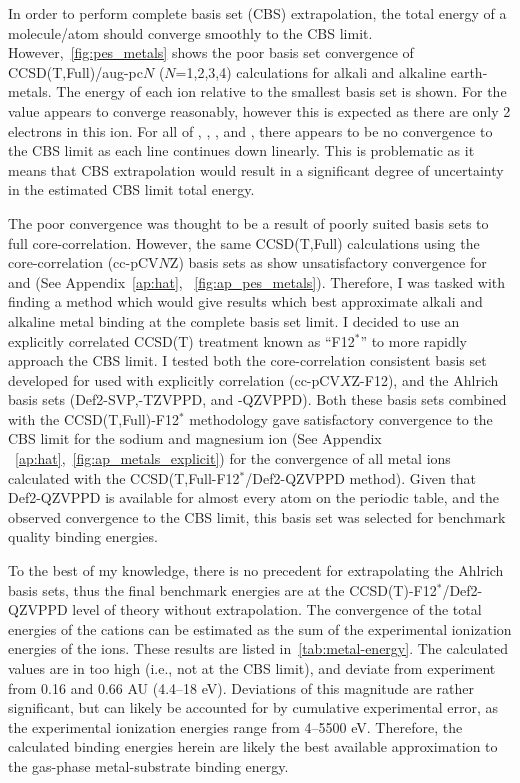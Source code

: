 In order to perform complete basis set (CBS) extrapolation, the total energy of a molecule/atom should converge smoothly to the CBS limit.\cite{Truhlar1998} However,~\ref{fig:pes_metals} shows the poor basis set convergence of CCSD(T,Full)/aug-pc$N$ ($N$=1,2,3,4) calculations for alkali and alkaline earth-metals. The energy of each ion relative to the smallest basis set is shown. For  the value appears to converge reasonably, however this is expected as there are only 2 electrons in this ion. For all of , , , and , there appears to be no convergence to the CBS limit as each line continues down linearly. This is problematic as it means that CBS extrapolation would result in a significant degree of uncertainty in the estimated CBS limit total energy.

The poor convergence was thought to be a result of poorly suited basis sets to full core-correlation. However, the same CCSD(T,Full) calculations using the core-correlation (cc-pCV$N$Z) basis sets as show unsatisfactory convergence for  and  (See Appendix~\ref{ap:hat}, ~\ref{fig:ap_pes_metals}). Therefore, I was tasked with finding a method which would give results which best approximate alkali and alkaline metal binding at the complete basis set limit. I decided to use an explicitly correlated CCSD(T) treatment known as ``F12$^*$'' to more rapidly approach the CBS limit.\cite{Tenno2012} I tested both the core-correlation consistent basis set developed for used with explicitly correlation (cc-pCV$X$Z-F12),\cite{Peterson2008} and the Ahlrich basis sets (Def2-SVP,-TZVPPD, and -QZVPPD).\cite{Rappoport2010} Both these basis sets combined with the CCSD(T,Full)-F12$^*$ methodology gave satisfactory convergence to the CBS limit for the sodium and magnesium ion (See Appendix ~\ref{ap:hat},~\ref{fig:ap_metals_explicit}) for the convergence of all metal ions calculated with the CCSD(T,Full-F12$^*$/Def2-QZVPPD method). Given that Def2-QZVPPD is available for almost every atom on the periodic table, and the observed convergence to the CBS limit, this basis set was selected for benchmark quality binding energies.

To the best of my knowledge, there is no precedent for extrapolating the Ahlrich basis sets, thus the final benchmark energies are at the CCSD(T)-F12$^*$/Def2-QZVPPD level of theory without extrapolation. The convergence of the total energies of the cations can be estimated as the sum of the experimental ionization energies of the ions. These results are listed in~\ref{tab:metal-energy}. The calculated values are in too high (i.e., not at the CBS limit), and deviate from experiment from 0.16 and 0.66 AU (4.4--18 eV). Deviations of this magnitude are rather significant, but can likely be accounted for by cumulative experimental error, as the experimental ionization energies range from 4--5500 eV. Therefore, the calculated binding energies herein are likely the best available approximation to the gas-phase metal-substrate binding energy.

